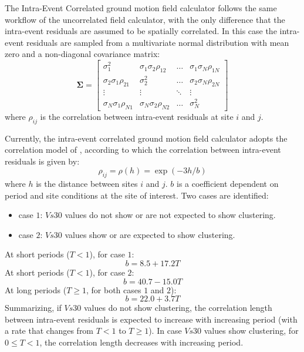 The Intra-Event Correlated ground motion field calculator follows the same 
workflow of the uncorrelated field calculator, with the only difference that 
the intra-event residuals are assumed to be spatially correlated. 
%
In this case the intra-event residuals are sampled from a multivariate 
normal distribution with mean zero and a non-diagonal covariance matrix:
\begin{equation}
\bm{\Sigma}=
\begin{bmatrix}
\sigma^{2}_{1} &  \sigma_{1}\sigma_{2}\rho_{12}  & \ldots &  \sigma_{1}\sigma_{N}\rho_{1N}\\
\sigma_{2}\sigma_{1}\rho_{21}  &  \sigma^{2}_{2} & \ldots &  \sigma_{2}\sigma_{N}\rho_{2N}\\
\vdots & \vdots & \ddots & \vdots\\
\sigma_{N}\sigma_{1}\rho_{N1}  &   \sigma_{N}\sigma_{2}\rho_{N2}       &\ldots & \sigma^{2}_{N}
\end{bmatrix}
\end{equation}
where $\rho_{ij}$ is the correlation between intra-event residuals at site 
$i$ and $j$.

Currently, the intra-event correlated ground motion field calculator adopts 
the correlation model of \citet{jayaram2009}, according to which the 
correlation between intra-event residuals is given by:
 \begin{equation}
 \rho_{ij} = \rho(h) = \exp(-3h/b)
 \end{equation}
 where $h$ is the distance between sites $i$ and $j$. $b$ is a coefficient 
 dependent on period and site conditions at the site of interest. Two cases 
 are identified:
 \begin{itemize}
 \item case $1$:  $Vs30$ values do not show or are not expected to show 
 clustering.
 \item case $2$: $Vs30$ values show or are expected to show clustering.
 \end{itemize}
At short periods ($T<1$), for case $1$:
\begin{equation}
b = 8.5 + 17.2T
\end{equation}
At short periods ($T<1$), for case $2$:
\begin{equation}
b = 40.7 - 15.0T
\end{equation}
At long periods ($T\geq1$, for both cases $1$ and $2$):
\begin{equation}
b = 22.0 + 3.7T
\end{equation}
Summarizing, if $Vs30$ values do not show clustering, the correlation length 
between intra-event residuals is expected to increase with increasing period 
(with a rate that changes from $T<1$ to $T\geq1$). 
%
In case $Vs30$ values show clustering, for  $0\leq T<1$, the correlation length 
decreases with increasing period.

